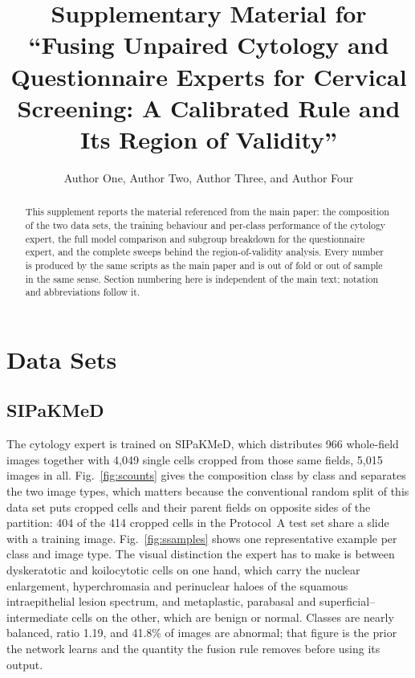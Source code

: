 \documentclass[lettersize,journal,onecolumn]{IEEEtran}
\begin{document}
\title{Supplementary Material for\\ ``Fusing Unpaired Cytology and Questionnaire Experts for Cervical Screening: A Calibrated Rule and Its Region of Validity''}
\author{Author One, Author Two, Author Three, and Author Four}
\maketitle

\begin{abstract}
This supplement reports the material referenced from the main paper: the composition of the two data sets, the training behaviour and per-class performance of the cytology expert, the full model comparison and subgroup breakdown for the questionnaire expert, and the complete sweeps behind the region-of-validity analysis. Every number is produced by the same scripts as the main paper and is out of fold or out of sample in the same sense. Section numbering here is independent of the main text; notation and abbreviations follow it.
\end{abstract}

\section{Data Sets}

\subsection{SIPaKMeD}
The cytology expert is trained on SIPaKMeD, which distributes 966 whole-field images together with 4,049 single cells cropped from those same fields, 5,015 images in all. Fig.~\ref{fig:scounts} gives the composition class by class and separates the two image types, which matters because the conventional random split of this data set puts cropped cells and their parent fields on opposite sides of the partition: 404 of the 414 cropped cells in the Protocol~A test set share a slide with a training image. Fig.~\ref{fig:ssamples} shows one representative example per class and image type. The visual distinction the expert has to make is between dyskeratotic and koilocytotic cells on one hand, which carry the nuclear enlargement, hyperchromasia and perinuclear haloes of the squamous intraepithelial lesion spectrum, and metaplastic, parabasal and superficial--intermediate cells on the other, which are benign or normal. Classes are nearly balanced, ratio 1.19, and 41.8\% of images are abnormal; that figure is the prior the network learns and the quantity the fusion rule removes before using its output.
\end{document}
